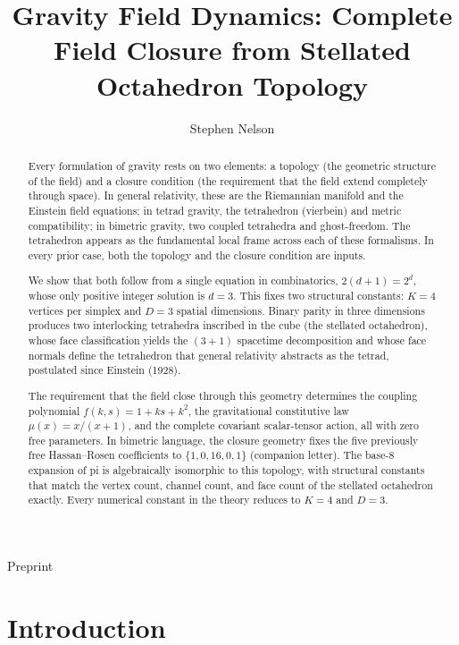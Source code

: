 \documentclass[twocolumn]{iopjournal}
\renewcommand{\articletype}[1]{%
  {\vspace*{-8mm}\noindent \Large \sf Preprint}\par
  \vspace*{6mm}\noindent{\scriptsize \sf{\bfseries \MakeUppercase{#1}}}}
\begin{document}
\articletype{Letter}

\title{Gravity Field Dynamics: Complete Field Closure from Stellated Octahedron Topology}

\author{Stephen Nelson}


\begin{abstract}
Every formulation of gravity rests on two elements: a topology (the geometric structure of the field) and a closure condition (the requirement that the field extend completely through space). In general relativity, these are the Riemannian manifold and the Einstein field equations; in tetrad gravity, the tetrahedron (vierbein) and metric compatibility; in bimetric gravity, two coupled tetrahedra and ghost-freedom. The tetrahedron appears as the fundamental local frame across each of these formalisms. In every prior case, both the topology and the closure condition are inputs.

We show that both follow from a single equation in combinatorics, $2(d+1) = 2^d$, whose only positive integer solution is $d = 3$. This fixes two structural constants: $K = 4$ vertices per simplex and $D = 3$ spatial dimensions. Binary parity in three dimensions produces two interlocking tetrahedra inscribed in the cube (the stellated octahedron), whose face classification yields the $(3+1)$ spacetime decomposition and whose face normals define the tetrahedron that general relativity abstracts as the tetrad, postulated since Einstein (1928).

The requirement that the field close through this geometry determines the coupling polynomial $f(k,s) = 1 + ks + k^2$, the gravitational constitutive law $\mu(x) = x/(x+1)$, and the complete covariant scalar-tensor action, all with zero free parameters. In bimetric language, the closure geometry fixes the five previously free Hassan--Rosen coefficients to $\{1, 0, 16, 0, 1\}$ (companion letter). The base-8 expansion of pi is algebraically isomorphic to this topology, with structural constants that match the vertex count, channel count, and face count of the stellated octahedron exactly. Every numerical constant in the theory reduces to $K = 4$ and $D = 3$.
\end{abstract}

\section*{Introduction}
\end{document}
